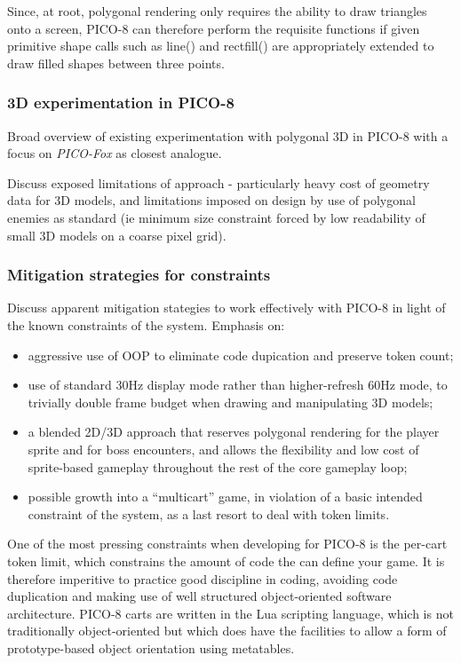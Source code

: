 \documentclass{article}
\begin{document}
Since, at root, polygonal rendering only requires the ability to draw triangles onto a
screen, PICO-8 can therefore perform the requisite functions if given primitive shape calls such
as line() and rectfill() are appropriately extended to draw filled shapes between three points.

\subsubsection*{3D experimentation in PICO-8}
Broad overview of existing experimentation with polygonal 3D in PICO-8 with a
focus on \textit{PICO-Fox} as closest analogue. 

Discuss exposed limitations of approach - particularly heavy cost of geometry data
for 3D models, and limitations imposed on design by use of polygonal enemies as
standard (ie minimum size constraint forced by low readability of small 3D models
on a coarse pixel grid).

\subsubsection*{Mitigation strategies for constraints}
Discuss apparent mitigation stategies to work effectively with PICO-8 in light of
the known constraints of the system. Emphasis on:
\begin{itemize}
   \item aggressive use of OOP to eliminate code dupication and preserve token count;
   \item use of standard 30Hz display mode rather than higher-refresh 60Hz mode, to
   trivially double frame budget when drawing and manipulating 3D models;
   \item a blended 2D/3D approach that reserves polygonal rendering for the player
   sprite and for boss encounters, and allows the flexibility and low cost of
   sprite-based gameplay throughout the rest of the core gameplay loop;
   \item possible growth into a ``multicart'' game, in violation of a basic intended
   constraint of the system, as a last resort to deal with token limits.
\end{itemize}


One of the most pressing constraints when developing for PICO-8 is the per-cart token
limit, which constrains the amount of code the can define your game. It is therefore
imperitive to practice good discipline in coding, avoiding code duplication and making use
of well structured object-oriented software architecture. PICO-8 carts are written in the
Lua scripting language, which is not traditionally object-oriented but which does have the
facilities to allow a form of prototype-based object orientation using metatables.
\end{document}
